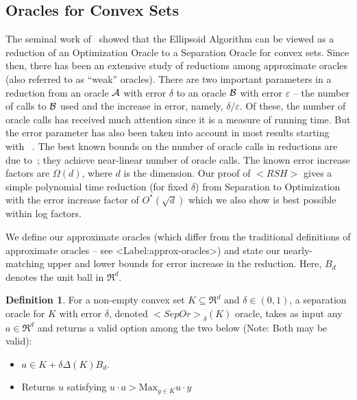 \documentclass[11pt,letterpaper]{article}
\newcounter{note}[section]
\def\mathsf#1{<#1>}%
\def\xspace{}%
\def\Cref#1{<Label:#1>}%
\theoremstyle{definition}
\newtheorem{defn}[theorem]{Definition}
\theoremstyle{remark}
\newcommand{\rsh}{{\mathsf {RSH}}\xspace}
\newcommand{\sep}{{\mathsf{SepOr}}}
\begin{document}
\noindent
\subsection{Oracles for Convex Sets} 
The seminal work of~\cite{GLS1988} showed that the Ellipsoid Algorithm can be viewed as a reduction of an Optimization Oracle 
to a Separation Oracle for convex sets. Since then, there has been an extensive study of reductions among approximate oracles (also referred to as ``weak'' oracles).
There are two important parameters in a reduction from an oracle ${\cal A}$ with error $\delta$ to an oracle ${\cal B}$ with error $\varepsilon$ --  the number of calls to ${\cal B}$ used and the increase in error, namely, $\delta/\varepsilon$. Of these, the number of oracle calls has received much attention
since it is a measure of running time.
But the error parameter has also been taken into account in most results starting with ~\cite{GLS1988}. The best known bounds on the number of oracle calls in reductions are due to~\cite{LeeSV18}; they achieve near-linear number of oracle calls. The known error increase factors are $\Omega(d)$, where $d$ is the dimension. Our proof of $\rsh$ gives a 
simple polynomial time reduction (for fixed $\delta$) from Separation to Optimization
with the error increase factor of $O^*(\sqrt d)$ which we also show is best possible within log factors.

We define our approximate oracles (which differ from the traditional definitions of approximate oracles --  see \Cref{approx-oracles}) and state our nearly-matching upper and lower bounds for error increase in the reduction. Here, $B_d$ denotes the unit ball in $\Re^d$. 

\begin{defn}\label{defn-Sep}
For a non-empty convex set $K\subseteq\Re^d$ and $\delta\in (0,1)$, a separation oracle for $K$ with error $\delta$, denoted $\sep_\delta(K)$ oracle,  takes as input any $a\in \Re^d$ and returns a valid option among the two below (Note: Both may be valid):
\begin{itemize}
\item $a\in K+\delta \Delta (K) B_d$.
\item Returns $u$ satisfying
$u\cdot a >\mbox{Max}_{y\in K}u\cdot y$
\end{itemize} 
\end{defn}
\end{document}
